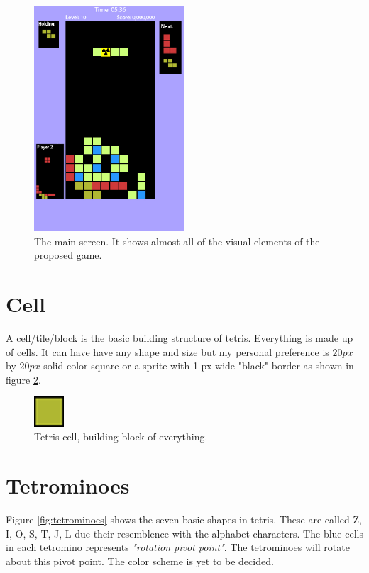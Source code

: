 \documentclass[10pt]{report}
\theoremstyle{definition}
\theoremstyle{remark}
\begin{document}
\begin{figure}
\label{fig:mainScreen}
  \centering
    \includegraphics[width=0.5\textwidth]{mainScreen}
    \caption[Main Gameplay Screen]{The main screen. It shows almost all of the visual elements of the proposed game.}
\end{figure}

\section{Cell}
A cell/tile/block is the basic building structure of tetris. Everything is made up of cells. It can have have any shape and size but my personal preference is $20 px$ by $20 px$ solid color square or a sprite with 1 px wide "black" border as shown in figure \ref{fig:cell}.

\begin{figure}
\label{fig:cell}
  \centering
    \includegraphics[width=0.1\textwidth]{cell}
    \caption[Tetris cell]{Tetris cell, building block of everything.}
\end{figure}


\section{Tetrominoes}
Figure \ref{fig:tetrominoes} shows the seven basic shapes in tetris. These are called Z, I, O, S, T, J, L due their resemblence with the alphabet characters. The blue cells in each tetromino represents \emph{"rotation pivot point"}. The tetrominoes will rotate about this pivot point. The color scheme is yet to be decided.
\end{document}
